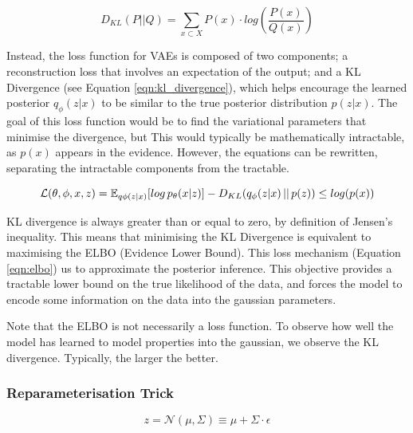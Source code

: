 \documentclass[12pt,twoside]{report}
\begin{document}
\begin{equation}
	\label{eqn:kl_divergence}
D_{KL}(P ||Q) = \sum_{x \subset X} P(x) \cdot log (\frac{P(x)}{Q(x)})
\end{equation}

Instead, the loss function for VAEs is composed of two components; a reconstruction loss that involves an expectation of the output; and a KL Divergence (see Equation \ref{eqn:kl_divergence}), which helps encourage the learned posterior $q_\phi(z|x)$ to be similar to the true posterior distribution $p(z|x)$. The goal of this loss function would be to find the variational parameters that minimise the divergence, but This would typically be mathematically intractable, as $p(x)$ appears in the evidence. However, the equations can be rewritten, separating the intractable components from the tractable.

\begin{equation}
	\label{eqn:elbo}
	\mathcal{L}(\theta, \phi, x, z) = \mathbb{E}_{q \phi (z|x)}[log \thinspace p_{\theta}(x|z)] - D_{KL}(q_{\phi}(z|x)\thinspace||\thinspace p(z)) \leq log (p(x))
\end{equation}

KL divergence is always greater than or equal to zero, by definition of Jensen's inequality. This means that minimising the KL Divergence is equivalent to maximising the ELBO (Evidence Lower Bound). This loss mechanism (Equation \ref{eqn:elbo})  us to approximate the posterior inference. This objective provides a tractable lower bound on the true likelihood of the data, and forces the model to encode some information on the data into the gaussian parameters.

Note that the ELBO is not necessarily a loss function. To observe how well the model has learned to model properties into the gaussian, we observe the KL divergence. Typically, the larger the better.


\subsubsection*{Reparameterisation Trick}
\label{reparam_trick}

\begin{equation}
	\label{eqn:reparam}
	z = \mathcal{N}(\mu, \Sigma) \equiv \mu + \Sigma \cdot \epsilon
\end{equation}
\end{document}
